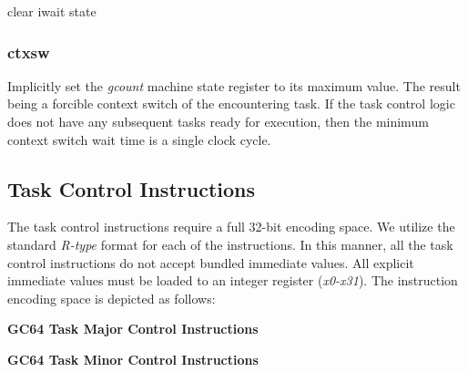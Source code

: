 \documentclass{article}
\begin{document}
\begin{algorithm}[H]
 clear iwait state
\end{algorithm}

\subsubsection{ctxsw}

Implicitly set the \emph{gcount} machine state register
to its maximum value.  The result being a forcible context
switch of the encountering task.  If the task control logic
does not have any subsequent tasks ready for execution, then the
minimum context switch wait time is a single clock cycle.  

\subsection{Task Control Instructions}

The task control instructions require a full 32-bit encoding space.  We utilize
the standard \emph{R-type} format for each of the instructions.  In this manner, 
all the task control instructions do not accept bundled immediate values.  All 
explicit immediate values must be loaded to an integer register (\emph{x0-x31}).
The instruction encoding space is depicted as follows: 

\begin{center}
\textbf{GC64 Task Major Control Instructions}
\makebox[0.03in][s]{}\makebox[0.03in][s]{}\makebox[0.03in][s]{}\makebox[0.03in][s]{}\makebox[0.03in][s]{}
\end{center}

\begin{center}
\textbf{GC64 Task Minor Control Instructions}
\makebox[0.03in][s]{}\makebox[0.03in][s]{}\makebox[0.03in][s]{}\makebox[0.03in][s]{}\makebox[0.03in][s]{}
\end{center}
\end{document}
